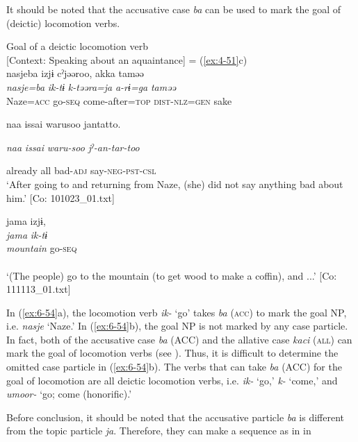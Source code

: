 \begin{table}
It should be noted that the accusative case \textit{ba} can be used to mark the goal of (deictic) locomotion verbs.

\ea\label{ex:6-54}
 Goal of a deictic locomotion verb\\

 \ea {\TM}  [Context: Speaking about an aquaintance] = (\ref{ex:4-51}c)\\
\glll nasjeba  izjɨ  cˀjəəroo,  akka  taməə\\
\textit{nasje=ba}  \textit{ik-tɨ}  \textit{k-təəra=ja}  \textit{a-rɨ=ga}  \textit{taməə}\\
Naze=\textsc{acc}  go-\textsc{seq}  come-after=\textsc{top}  \textsc{dist}-\textsc{nlz}=\textsc{gen}  sake

      naa  issai  warusoo  jantatto.

      \textit{naa}  \textit{issai}  \textit{waru-soo}  \textit{jˀ-an-tar-too}

      already  all  bad-\textsc{adj}  say-\textsc{neg}-\textsc{pst}-\textsc{csl}\\
\glt ‘After going to and returning from Naze, (she) did not say anything bad about him.’ [Co: 101023\_01.txt]
\z

\ex {\TM}  jama  izjɨ,\\
\glll \textit{jama}  \textit{ik-tɨ}\\
\textit{mountain}  go-\textsc{seq}\\\\
\glt ‘(The people) go to the mountain (to get wood to make a coffin), and ...’ [Co: 111113\_01.txt]
\z

In (\ref{ex:6-54}a), the locomotion verb \textit{ik-} ‘go’ takes \textit{ba} (\textsc{acc}) to mark the goal NP, i.e. \textit{nasje} ‘Naze.’ In (\ref{ex:6-54}b), the goal NP is not marked by any case particle. In fact, both of the accusative case \textit{ba} (ACC) and the allative case \textit{kaci} (\textsc{all}) can mark the goal of locomotion verbs (see ). Thus, it is difficult to determine the omitted case particle in (\ref{ex:6-54}b). The verbs that can take \textit{ba} (ACC) for the goal of locomotion are all deictic locomotion verbs, i.e. \textit{ik-} ‘go,’ \textit{k-} ‘come,’ and \textit{umoor-} ‘go; come (honorific).’

  Before conclusion, it should be noted that the accusative particle \textit{ba} is different from the topic particle \textit{ja}. Therefore, they can make a sequence as in  in 


\end{table}
